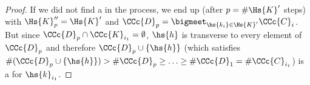 \begin{proof}
If we did not find a \countc in the process, we end up (after $p=\#\Hs{K}'$ steps) with $\Hs{K}''_p=\Hs{K}'$ and $\CCc{D}_{p} = \bigmeet_{\hs{k_i} \in \Hs{K}'}\CCc{C}_i$. But since $\CCc{D}_p \cap \CCc{K}_{i_1}=\emptyset$,  $\hs{h}$ is transverse to every element of  $\CCc{D}_{p}$ and therefore $\CCc{D}_{p}\cup \{\hs{h}\}$ (which satisfies $\#(\CCc{D}_{p}\cup \{\hs{h}\})> \#\CCc{D}_p\ge\ldots\ge\#\CCc{D}_1=\#\CCc{C}_{i_1}$) is a \countc for  $\hs{k}_{i_1}$.
\end{proof}
